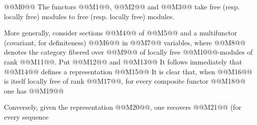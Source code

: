 
@@M0@@
The functors @@M1@@, @@M2@@ and @@M3@@ take free (resp. locally free) modules to free (resp. locally free) modules.

More generally, consider sections @@M4@@ of @@M5@@ and a multifunctor (covariant, for definiteness)
@@M6@@
in @@M7@@ variables, where @@M8@@ denotes the category fibered over @@M9@@ of locally free @@M10@@-modules of rank @@M11@@. Put
@@M12@@
and
@@M13@@
It follows immediately that @@M14@@ defines a representation
@@M15@@
It is clear that, when @@M16@@ is itself locally free of rank @@M17@@, for every composite functor
@@M18@@
one has
@@M19@@

Conversely, given the representation @@M20@@, one recovers @@M21@@ (for every sequence
